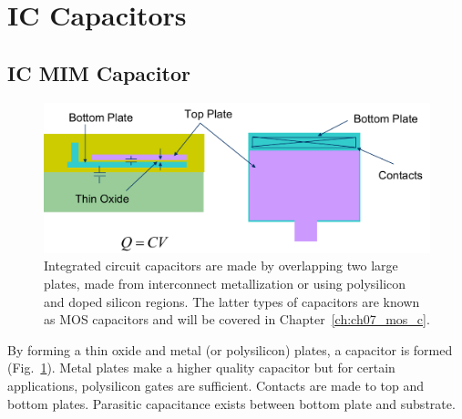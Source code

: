 \section{IC Capacitors}
\subsection{IC MIM Capacitor}
\begin{figure}[tb]
\centering
\includegraphics[width=.75\columnwidth]{mod2-2_ICtech_sld_17}
\caption{Integrated circuit capacitors are made by overlapping two large plates, made from interconnect metallization or using polysilicon and doped silicon regions.  The latter types of capacitors are known as MOS capacitors and will be covered in Chapter~\ref{ch:ch07_mos_c}.}
\label{fig:mod2-2_ICtech_sld_17}
\end{figure}
By forming a thin oxide and metal (or polysilicon) plates, a capacitor is formed (Fig.~\ref{fig:mod2-2_ICtech_sld_17}).  Metal plates make a higher quality capacitor but for certain applications, polysilicon gates are sufficient.   Contacts are made to top and bottom plates.   Parasitic capacitance exists between bottom plate and substrate.
